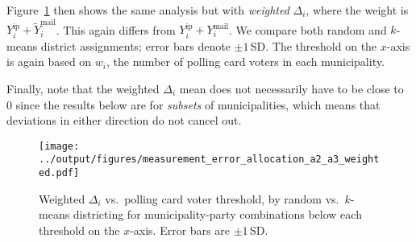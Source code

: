 \documentclass[12pt]{article}
\newcommand{\ip}{\text{ip}}
\newcommand{\mail}{\text{mail}}
\begin{document}
Figure~\ref{fig:measurement_error_allocation_a2_a3_weighted} then shows the same analysis but with \emph{weighted} $\Delta_i$, where the weight is $Y_i^{\ip} + \widetilde{Y}_i^{\mail}$. This again differs from $Y_i^{\ip} + Y_i^{\mail}$. We compare both random and $k$-means district assignments; error bars denote $\pm 1$\,SD. The threshold on the $x$-axis is again based on $w_i$, the number of polling card voters in each municipality.

Finally, note that the weighted $\Delta_i$ mean does not necessarily have to be close to $0$ since the results below are for \textit{subsets} of municipalities, which means that deviations in either direction do not cancel out.

\begin{figure}[!h]
\centering
\texttt{[image: ../output/figures/measurement\_error\_allocation\_a2\_a3\_weighted.pdf]}
\caption{Weighted $\Delta_i$ vs.\ polling card voter threshold, by random vs.\ $k$-means districting for municipality-party combinations below each threshold on the $x$-axis. Error bars are $\pm 1$\,SD.}
\label{fig:measurement_error_allocation_a2_a3_weighted}
\end{figure}
\end{document}
